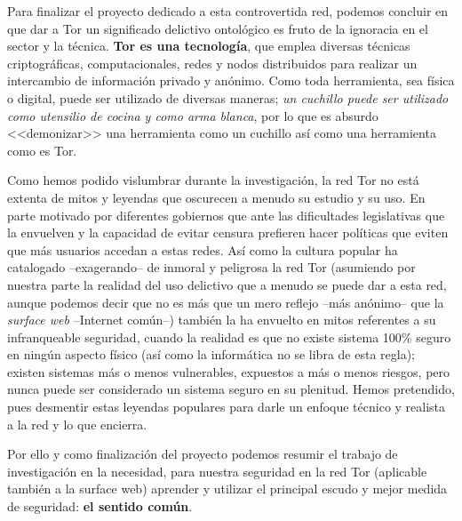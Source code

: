 \documentclass[a4paper, 11pt, titlepage]{article}
\begin{document}
    Para finalizar el proyecto dedicado a esta controvertida red, podemos concluir en que dar a Tor un significado delictivo 
    ontológico es fruto de la ignoracia en el sector y la técnica. \textbf{Tor es una tecnología}, que emplea diversas 
    técnicas criptográficas, computacionales, redes y nodos distribuidos para realizar un intercambio de información 
    privado y anónimo. Como toda herramienta, sea física o digital, puede ser utilizado de diversas maneras; \emph{un 
    cuchillo puede ser utilizado como utensilio de cocina y como arma blanca}, por lo que es absurdo <<demonizar>> una 
    herramienta como un cuchillo así como una herramienta como es Tor.

    Como hemos podido vislumbrar durante la investigación, la red Tor no está extenta de mitos y leyendas que oscurecen a 
    menudo su estudio y su uso. En parte motivado por diferentes gobiernos que ante las dificultades legislativas que la 
    envuelven y la capacidad de evitar censura prefieren hacer políticas que eviten que más usuarios accedan a estas redes. 
    Así como la cultura popular ha catalogado --exagerando-- de inmoral y peligrosa la red Tor (asumiendo por nuestra parte 
    la realidad del uso delictivo que a menudo se puede dar a esta red, aunque podemos decir que no es más que un mero 
    reflejo --más anónimo-- que la \emph{surface web} --Internet común--) también la ha envuelto en mitos referentes a su 
    infranqueable seguridad, cuando la realidad es que no existe sistema 100\% seguro en ningún aspecto físico (así como 
    la informática no se libra de esta regla); existen sistemas más o menos vulnerables, expuestos a más o menos riesgos, 
    pero nunca puede ser considerado un sistema seguro en su plenitud. Hemos pretendido, pues desmentir estas leyendas 
    populares para darle un enfoque técnico y realista a la red y lo que encierra.  

    Por ello y como finalización del proyecto podemos resumir el trabajo de investigación en la necesidad, para nuestra 
    seguridad en la red Tor (aplicable también a la surface web) aprender y utilizar el principal escudo y mejor medida 
    de seguridad: \textbf{el sentido común}.
\end{document}
